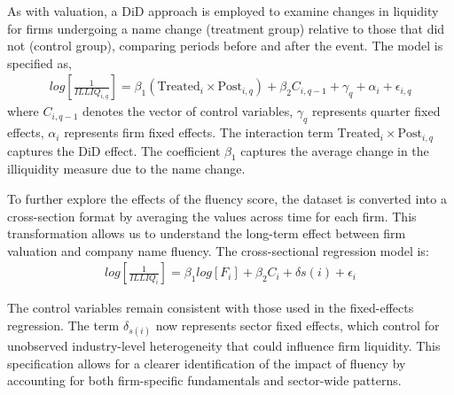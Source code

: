 \documentclass[a4paper,11pt]{report}
\begin{document}
As with valuation, a DiD approach is employed to examine changes in liquidity for firms undergoing a name change (treatment group) relative to those that did not (control group), comparing periods before and after the event. The model is specified as,
\begin{align}
    log\left[\frac{1}{ILLIQ_{i,q}}\right] = \beta_1 \left(\text{Treated}_i \times \text{Post}_{i,q}\right) 
    + \beta_2 C_{i,q-1} + \gamma_q + \alpha_i + \epsilon_{i,q}
\end{align}
where $C_{i,q-1}$ denotes the vector of control variables, $\gamma_q$ represents quarter fixed effects, $\alpha_i$ represents firm fixed effects. The interaction term $\text{Treated}_i \times \text{Post}_{i,q}$ captures the DiD effect. The coefficient $\beta_1$ captures the average change in the illiquidity measure due to the name change.
\begin{comment}
An event study is used to understand the short-term effect of change in company name. The study focuses on an event window spanning four quarters before and after the name change (i.e., from t $= -4$ to t = $= +4$), capturing any pre-event or post-event effect over a two-year period. Similar to valuation, the event study is structured as following, 
\begin{align}
    log\left[\frac{1}{ILLIQ_{i,q}}\right]  = \sum_{k=-4}^{4} \eta_k \cdot \text{REL}_{i,q}^{(k)} + {\beta_2}C_{i,q-1} +
               \gamma_q + \alpha_i + \epsilon_{i,q}
\end{align}
The control variable are same as the fixed-effect regression for liquidity. $\text{REL}_{i,q}^{(k)}$ is the dummy variable of the relative quarter $k$ from the event and $\eta_k$ capture the effect of the name change in each event-time quarter. $\gamma_q$ and $\alpha_i$
represent quarter and firm fixed effects respectively. 
\end{comment}
To further explore the effects of the fluency score, the dataset is converted into a cross-section format by averaging the values across time for each firm. This transformation allows us to understand the long-term effect between firm valuation and company name fluency. The cross-sectional regression model is:
\begin{align}
    log\left[\frac{1}{ILLIQ_{i}}\right] = \beta_1 log\left[F_{i}\right] + {\beta_2} C_{i} + \delta{s(i)} + \epsilon_{i}
\end{align}

The control variables remain consistent with those used in the fixed-effects regression. The term $\delta_{s(i)}$ now represents sector fixed effects, which control for unobserved industry-level heterogeneity that could influence firm liquidity. This specification allows for a clearer identification of the impact of fluency by accounting for both firm-specific fundamentals and sector-wide patterns.
\end{document}
